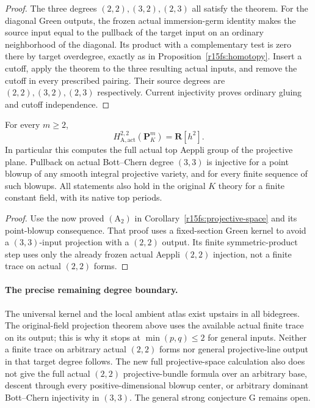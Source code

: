 \begin{proof}
The three degrees $(2,2),(3,2),(2,3)$ all satisfy the theorem.
For the diagonal Green outputs, the frozen actual immersion-germ
identity makes the source input equal to the pullback of the target
input on an ordinary neighborhood of the diagonal. Its product
with a complementary test is zero there by target overdegree,
exactly as in Proposition~\ref{r15fs:homotopy}. Insert a cutoff,
apply the theorem to the three resulting actual inputs, and remove
the cutoff in every prescribed pairing. Their source degrees are
$(2,2),(3,2),(2,3)$ respectively. Current injectivity proves
ordinary gluing and cutoff independence.
\end{proof}

\begin{corollary}
\label{r15a2:full-HA22}
For every $m\geq2$,
\[
                H_{\mathrm A,\mathrm{act}}^{2,2}(\mathbf P_K^m)
                                      =\mathbf R[h^2].
\tag{A215.5}\label{r15a2:HA22}
\]
In particular this computes the full actual top Aeppli group
of the projective plane. Pullback on actual Bott--Chern degree
$(3,3)$ is injective for a point blowup of any smooth integral
projective variety, and for every finite sequence of such blowups.
All statements also hold in the original $K$ theory for a finite
constant field, with its native top periods.
\end{corollary}

\begin{proof}
Use the now proved $(\mathrm A_2)$ in
Corollary~\ref{r15fs:projective-space} and its point-blowup
consequence. That proof uses a fixed-section Green kernel to
avoid a $(3,3)$-input projection with a $(2,2)$ output.
Its finite symmetric-product step uses only the already frozen
actual Aeppli $(2,2)$ injection, not a finite trace on actual
$(2,2)$ forms.
\end{proof}

\paragraph{The precise remaining degree boundary.}
The universal kernel and the local ambient atlas exist upstairs
in all bidegrees. The original-field projection theorem above
uses the available actual finite trace on its output; this is
why it stops at $\min(p,q)\leq2$ for general inputs. Neither a
finite trace on arbitrary actual $(2,2)$ forms nor general
projective-line output in that target degree follows. The new
full projective-space calculation also does not give the full
actual $(2,2)$ projective-bundle formula over an arbitrary base,
descent through every positive-dimensional blowup center, or
arbitrary dominant Bott--Chern injectivity in $(3,3)$.
The general strong conjecture G remains open.
